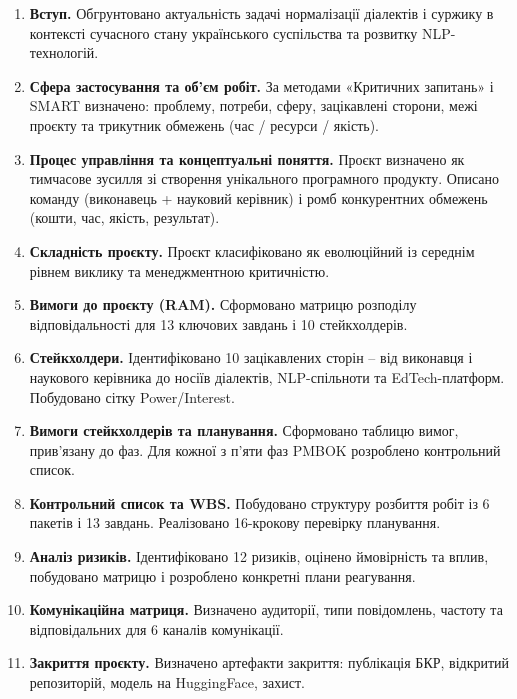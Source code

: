 \documentclass[14pt]{extarticle}
\begin{document}
\begin{enumerate}
  \item \textbf{Вступ.} Обгрунтовано актуальність задачі нормалізації діалектів і суржику в контексті сучасного стану українського суспільства та розвитку NLP-технологій.

  \item \textbf{Сфера застосування та об'єм робіт.} За методами «Критичних запитань» і SMART визначено: проблему, потреби, сферу, зацікавлені сторони, межі проєкту та трикутник обмежень (час / ресурси / якість).

  \item \textbf{Процес управління та концептуальні поняття.} Проєкт визначено як тимчасове зусилля зі створення унікального програмного продукту. Описано команду (виконавець + науковий керівник) і ромб конкурентних обмежень (кошти, час, якість, результат).

  \item \textbf{Складність проєкту.} Проєкт класифіковано як еволюційний із середнім рівнем виклику та менеджментною критичністю.

  \item \textbf{Вимоги до проєкту (RAM).} Сформовано матрицю розподілу відповідальності для 13 ключових завдань і 10 стейкхолдерів.

  \item \textbf{Стейкхолдери.} Ідентифіковано 10 зацікавлених сторін -- від виконавця і наукового керівника до носіїв діалектів, NLP-спільноти та EdTech-платформ. Побудовано сітку Power/Interest.

  \item \textbf{Вимоги стейкхолдерів та планування.} Сформовано таблицю вимог, прив'язану до фаз. Для кожної з п'яти фаз PMBOK розроблено контрольний список.

  \item \textbf{Контрольний список та WBS.} Побудовано структуру розбиття робіт із 6 пакетів і 13 завдань. Реалізовано 16-крокову перевірку планування.

  \item \textbf{Аналіз ризиків.} Ідентифіковано 12 ризиків, оцінено ймовірність та вплив, побудовано матрицю і розроблено конкретні плани реагування.

  \item \textbf{Комунікаційна матриця.} Визначено аудиторії, типи повідомлень, частоту та відповідальних для 6 каналів комунікації.

  \item \textbf{Закриття проєкту.} Визначено артефакти закриття: публікація БКР, відкритий репозиторій, модель на HuggingFace, захист.


\end{enumerate}
\end{document}
